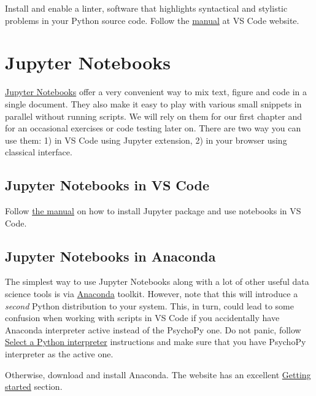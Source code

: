 \documentclass[
]{book}
\begin{document}
Install and enable a linter, software that highlights syntactical and stylistic problems in your Python source code. Follow the \href{https://code.visualstudio.com/docs/python/linting}{manual} at VS Code website.

\hypertarget{jupyter-notebooks}{%
\section{Jupyter Notebooks}\label{jupyter-notebooks}}

\href{https://jupyter.org/}{Jupyter Notebooks} offer a very convenient way to mix text, figure and code in a single document. They also make it easy to play with various small snippets in parallel without running scripts. We will rely on them for our first chapter and for an occasional exercises or code testing later on. There are two way you can use them: 1) in VS Code using Jupyter extension, 2) in your browser using classical interface.

\hypertarget{jupyter-notebooks-in-vs-code}{%
\subsection{Jupyter Notebooks in VS Code}\label{jupyter-notebooks-in-vs-code}}

Follow \href{https://code.visualstudio.com/docs/datascience/jupyter-notebooks}{the manual} on how to install Jupyter package and use notebooks in VS Code.

\hypertarget{jupyter-notebooks-in-anaconda}{%
\subsection{Jupyter Notebooks in Anaconda}\label{jupyter-notebooks-in-anaconda}}

The simplest way to use Jupyter Notebooks along with a lot of other useful data science tools is via \href{https://www.anaconda.com/products/individual}{Anaconda} toolkit. However, note that this will introduce a \emph{second} Python distribution to your system. This, in turn, could lead to some confusion when working with scripts in VS Code if you accidentally have Anaconda interpreter active instead of the PsychoPy one. Do not panic, follow \href{https://code.visualstudio.com/docs/python/python-tutorial\#_select-a-python-interpreter}{Select a Python interpreter} instructions and make sure that you have PsychoPy interpreter as the active one.

Otherwise, download and install Anaconda. The website has an excellent \href{https://docs.anaconda.com/anaconda/user-guide/getting-started/}{Getting started} section.
\end{document}
